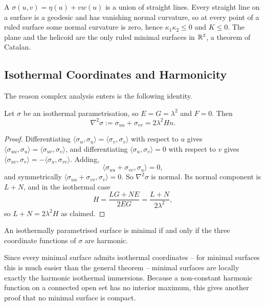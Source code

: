 \documentclass[a4paper]{scrartcl}
\begin{document}
\begin{example}
    A  $\sigma(u,v) = \eta(u) + v w(u)$ is a union of straight lines. Every straight line on a surface is a geodesic and has vanishing normal curvature, so at every point of a ruled surface some normal curvature is zero, hence $\kappa_1\kappa_2 \leq 0$ and $K \leq 0$. The plane and the helicoid are the only ruled minimal surfaces in $\mathbb{R}^3$, a theorem of Catalan.
\end{example}

\subsection{Isothermal Coordinates and Harmonicity}

The reason complex analysis enters is the following identity.

\begin{proposition}
    Let $\sigma$ be an isothermal parametrisation, so $E = G = \lambda^2$ and $F = 0$. Then
    $$
    \nabla^2 \sigma := \sigma_{uu} + \sigma_{vv} = 2\lambda^2 H n.
    $$
\end{proposition}
\begin{proof}
    Differentiating $\langle\sigma_u,\sigma_u\rangle = \langle\sigma_v,\sigma_v\rangle$ with respect to $u$ gives $\langle \sigma_{uu},\sigma_u\rangle = \langle\sigma_{uv},\sigma_v\rangle$, and differentiating $\langle\sigma_u,\sigma_v\rangle = 0$ with respect to $v$ gives $\langle\sigma_{uv},\sigma_v\rangle = -\langle\sigma_u,\sigma_{vv}\rangle$. Adding,
    $$
    \langle \sigma_{uu}+\sigma_{vv}, \sigma_u\rangle = 0,
    $$
    and symmetrically $\langle \sigma_{uu}+\sigma_{vv},\sigma_v\rangle = 0$. So $\nabla^2\sigma$ is normal. Its normal component is $L + N$, and in the isothermal case
    $$
    H = \frac{LG + NE}{2EG} = \frac{L+N}{2\lambda^2},
    $$
    so $L + N = 2\lambda^2 H$ as claimed.
\end{proof}

\begin{corollary}
    An isothermally parametrised surface is minimal if and only if the three coordinate functions of $\sigma$ are harmonic.
\end{corollary}

Since every minimal surface admits isothermal coordinates -- for minimal surfaces this is much easier than the general theorem -- minimal surfaces are locally exactly the harmonic isothermal immersions. Because a non-constant harmonic function on a connected open set has no interior maximum, this gives another proof that no minimal surface is compact.
\end{document}
